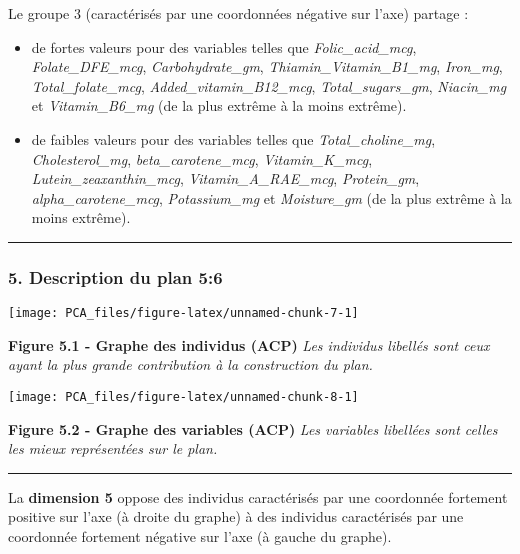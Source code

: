 \documentclass[]{article}
\providecommand{\tightlist}{%
  \setlength{\itemsep}{0pt}\setlength{\parskip}{0pt}}
\begin{document}
Le groupe 3 (caractérisés par une coordonnées négative sur l'axe)
partage :

\begin{itemize}
\tightlist
\item
  de fortes valeurs pour des variables telles que
  \emph{Folic\_acid\_mcg}, \emph{Folate\_DFE\_mcg},
  \emph{Carbohydrate\_gm}, \emph{Thiamin\_Vitamin\_B1\_mg},
  \emph{Iron\_mg}, \emph{Total\_folate\_mcg},
  \emph{Added\_vitamin\_B12\_mcg}, \emph{Total\_sugars\_gm},
  \emph{Niacin\_mg} et \emph{Vitamin\_B6\_mg} (de la plus extrême à la
  moins extrême).
\item
  de faibles valeurs pour des variables telles que
  \emph{Total\_choline\_mg}, \emph{Cholesterol\_mg},
  \emph{beta\_carotene\_mcg}, \emph{Vitamin\_K\_mcg},
  \emph{Lutein\_zeaxanthin\_mcg}, \emph{Vitamin\_A\_RAE\_mcg},
  \emph{Protein\_gm}, \emph{alpha\_carotene\_mcg}, \emph{Potassium\_mg}
  et \emph{Moisture\_gm} (de la plus extrême à la moins extrême).
\end{itemize}

\begin{center}\rule{0.5\linewidth}{\linethickness}\end{center}

\subsubsection{5. Description du plan 5:6}\label{description-du-plan-56}

\begin{center}\texttt{[image: PCA\_files/figure-latex/unnamed-chunk-7-1]} \end{center}

\textbf{Figure 5.1 - Graphe des individus (ACP)} \emph{Les individus
libellés sont ceux ayant la plus grande contribution à la construction
du plan.}

\begin{center}\texttt{[image: PCA\_files/figure-latex/unnamed-chunk-8-1]} \end{center}

\textbf{Figure 5.2 - Graphe des variables (ACP)} \emph{Les variables
libellées sont celles les mieux représentées sur le plan.}

\begin{center}\rule{0.5\linewidth}{\linethickness}\end{center}

La \textbf{dimension 5} oppose des individus caractérisés par une
coordonnée fortement positive sur l'axe (à droite du graphe) à des
individus caractérisés par une coordonnée fortement négative sur l'axe
(à gauche du graphe).
\end{document}
